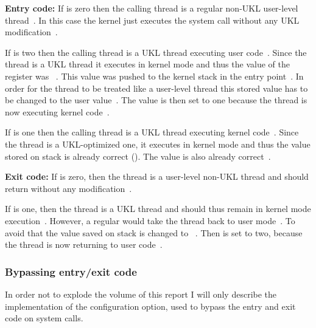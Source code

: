 \documentclass[10pt,twocolumn,a4paper]{article}
\begin{document}
      \textbf{Entry code:}
      If  is zero then the calling thread is a regular non-UKL 
      user-level thread~\cite{ukl-github-inuser-getter-setter}.
      In this case the kernel just executes the system call without any UKL modification~\cite{ukl-github-entry}.

      If  is two then the calling thread is a UKL thread executing 
      user code~\cite{ukl-github-inuser-getter-setter}.
      Since the thread is a UKL thread it executes in kernel mode and thus the value of the 
       register was ~\cite{raza23}.
      This value was pushed to the kernel stack in the  
      entry point~\cite{ukl-github-entry}.
      In order for the thread to be treated like a user-level thread this stored  
      value has to be changed to the user  value~\cite{ukl-github-entry}.
      The  value is then set to one because the thread is now executing 
      kernel code~\cite{ukl-github-entry, ukl-github-inuser-getter-setter}.

      If  is one then the calling thread is a UKL thread executing 
      kernel code~\cite{ukl-github-inuser-getter-setter}.
      Since the thread is a UKL-optimized one, it executes in kernel mode and thus the  value
      stored on stack is already correct ().
      The  value is also already correct~\cite{ukl-github-inuser-getter-setter}.

      \textbf{Exit code:}
      If  is zero, then the thread is a user-level non-UKL thread and should return
      without any modification~\cite{ukl-github-entry}.

      If  is one, then the thread is a UKL thread and should thus remain in 
      kernel mode execution~\cite{ukl-github-entry}.
      However, a regular  would take the thread back to user mode~\cite{ukl-github-entry}.
      To avoid that the  value saved on stack is changed to ~\cite{ukl-github-entry}.
      Then  is set to two, because the thread is now returning to user 
      code~\cite{ukl-github-entry}.

    \subsubsection{Bypassing entry/exit code}
      In order not to explode the volume of this report I will only describe the implementation
      of the  configuration option, used to bypass the entry and exit code
      on system calls.
\end{document}
